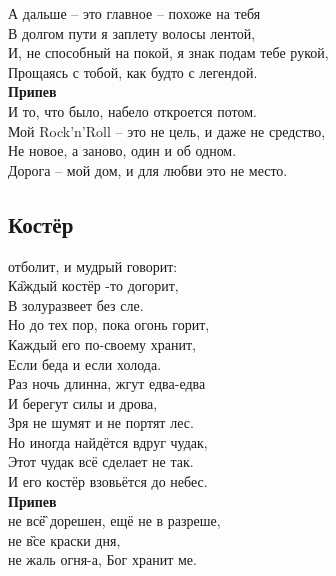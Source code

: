\documentclass[fleqn,a5paper,12pt,twoside]{guitartabs}
\begin{document}
    А дальше -- это главное -- похоже на тебя     \\
    В долгом пути я заплету волосы лентой,     \\
    И, не способный на покой, я знак подам тебе рукой,     \\
    Прощаясь с тобой, как будто с легендой.\\

    \-\hspace{10mm}\textbf{Припев}\\
        
    И то, что было, набело откроется потом.\\
    Мой Rock'n'Roll -- это не цель, и даже не средство,\\
    Не новое, а заново, один и об одном.\\
    Дорога -- мой дом, и для любви это не место.\\
\newpage
{}%
\subsection*{Костёр}
     отболит, и мудрый говорит: \\
    К\G{аждый} костёр -то догорит, \\
    В золу\Hm{ }развеет без сле.\\
    Но до тех пор, пока огонь горит, \\
    Каждый его по-своему хранит, \\
    Если беда и если холода.\\
    
    Раз ночь длинна, жгут едва-едва\\
    И берегут силы и дрова, \\
    Зря не шумят и не портят лес. \\
    Но иногда найдётся вдруг чудак,\\ 
    Этот чудак всё сделает не так. \\
    И его костёр взовьётся до небес.\\
    
    \-\hspace{10mm}\textbf{Припев}\\
    \-\hspace{10mm} не вс\G{ё} дорешен, \C{  }ещё не в разреше,\\
    \-\hspace{10mm} не \G{все}  краски дня,    \\
    \-\hspace{10mm} не жаль огня-а, Бог хранит ме. \\
    
\end{document}
